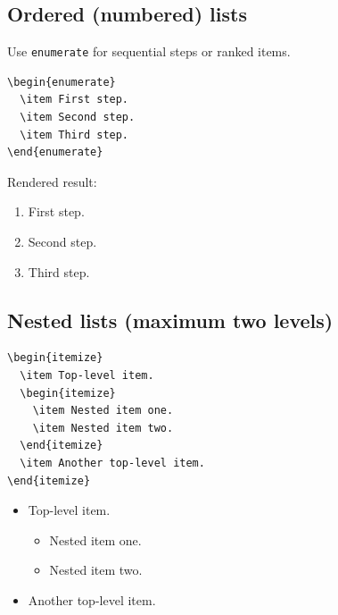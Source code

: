 \subsection{Ordered (numbered) lists}

Use \texttt{enumerate} for sequential steps or ranked items.

\begin{verbatim}
\begin{enumerate}
  \item First step.
  \item Second step.
  \item Third step.
\end{enumerate}
\end{verbatim}

Rendered result:

\begin{enumerate}
  \item First step.
  \item Second step.
  \item Third step.
\end{enumerate}

\subsection{Nested lists (maximum two levels)}

\begin{verbatim}
\begin{itemize}
  \item Top-level item.
  \begin{itemize}
    \item Nested item one.
    \item Nested item two.
  \end{itemize}
  \item Another top-level item.
\end{itemize}
\end{verbatim}

\begin{itemize}
  \item Top-level item.
  \begin{itemize}
    \item Nested item one.
    \item Nested item two.
  \end{itemize}
  \item Another top-level item.
\end{itemize}

